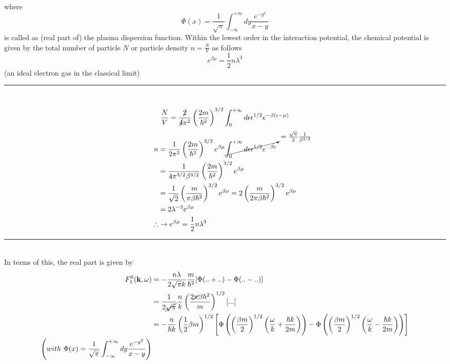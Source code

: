 where 
\begin{equation}
\Phi(x)=\frac{1}{\sqrt \pi} \int_{-\infty}^{+\infty} dy \frac{e^{-y^2}}{x-y}
\end{equation}
is called as (real part of) the plasma dispersion function.
 Within the lowest order in the interaction potential, the chemical potential is given by the total number of particle $N$ or particle density $n=\frac{N}{V}$ as follows
\begin{equation}
e^{\beta\mu}=\frac{1}{2}n\lambda^3
\end{equation}
(an ideal electron gas in the classical limit)\\
\rule{\textwidth}{0.1mm}\\
\[
\frac{N}{V}=\frac{\cancel{2}}{\cancel{4}\pi^2} \left( \frac{2m}{\hbar^2} \right)^{3/2} \int_0^{+\infty} d\epsilon \epsilon^{1/2} e^{-\beta(\epsilon-\mu)}
\]
\[
\begin{aligned}
n&=\frac{1}{2\pi^2} \left(\frac{2m}{\hbar^2}\right)^{3/2} e^{\beta\mu} \cancelto{=\frac{\sqrt \pi}{2}\frac{1}{\beta^{3/2}}}{\int_0^{+\infty} d\epsilon \epsilon^{1/2} e^{-\beta\epsilon}}\\
&=\frac{1}{4\pi^{3/2}\beta^{3/2}} \left(\frac{2m}{\hbar^2}\right)^{3/2} e^{\beta\mu} \\
&=\frac{1}{\sqrt 2} \left( \frac{m}{\pi \beta \hbar^2} \right)^{3/2} e^{\beta \mu}=2 \left( \frac{m}{2\pi \beta \hbar^2} \right)^{3/2} e^{\beta \mu}\\
&=2\lambda^{-3}e^{\beta\mu}\\
\therefore& \to e^{\beta\mu}=\frac{1}{2}n\lambda^3
\end{aligned}
\]
\rule{\textwidth}{0.1mm}\\
In terms of this, the real part is given by
\begin{equation}
\begin{aligned}
F^0_1(\mathbf k,\omega)&=-\frac{n\lambda}{2\sqrt \pi k}\frac{m}{\hbar^2} [\Phi(..+..)-\Phi(..-..)]\\
&=\frac{1}{2\cancel{\sqrt \pi}} \frac{n}{k} \left( \frac{2\cancel{\pi}\beta\hbar^2}{m} \right)^{1/2} [...]\\
&=-\frac{n}{\hbar k} \left( \frac{1}{2}\beta m \right)^{1/2} \left[ \Phi \left(\left(\frac{\beta m}{2}\right)^{1/2} \left( \frac{\omega}{k}+\frac{\hbar k}{2m} \right)\right)- \Phi \left(\left(\frac{\beta m}{2}\right)^{1/2} \left( \frac{\omega}{k}-\frac{\hbar k}{2m} \right)\right) \right]\\
\left( with\ \Phi(x)=\frac{1}{\sqrt \pi} \int_{-\infty}^{+\infty} dy \frac{e^{-y^2}}{x-y} \right)
\end{aligned}
\end{equation}
